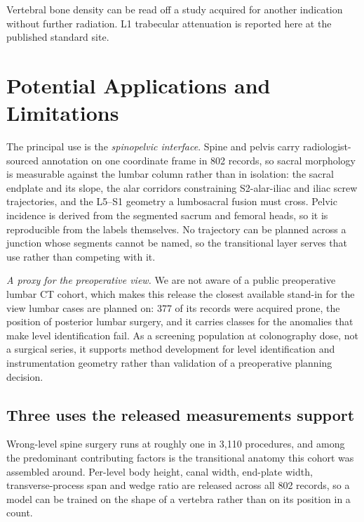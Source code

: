 \documentclass[aapm,mph,amsmath,amssymb,reprint]{revtex4-2}
\begin{document}

Vertebral bone density can be read off a study acquired for another indication without
further radiation.\cite{pickhardt2013} L1 trabecular attenuation is reported here at the
published standard site.

\section{Potential Applications and Limitations}\label{sec:applications}

The principal use is the \emph{spinopelvic interface}. Spine and pelvis carry
radiologist-sourced annotation on one coordinate frame in 802 records, so sacral morphology is
measurable against the lumbar column rather than in isolation: the sacral endplate and its
slope, the alar corridors constraining S2-alar-iliac and iliac screw trajectories, and the
L5--S1 geometry a lumbosacral fusion must cross. Pelvic incidence is derived from the segmented
sacrum and femoral heads, so it is reproducible from the labels themselves. No trajectory can
be planned across a junction whose segments cannot be named, so the transitional layer serves
that use rather than competing with it.

\emph{A proxy for the preoperative view.} We are not aware of a public preoperative lumbar CT
cohort, which makes this release the closest available stand-in for the view lumbar cases are
planned on: 377 of its records were acquired prone, the position of posterior lumbar surgery, and it carries classes for the
anomalies that make level identification fail. As a screening population at colonography
dose, not a surgical series, it supports method development for level identification and
instrumentation geometry rather than validation of a preoperative planning decision.

\subsection{Three uses the released measurements support}

Wrong-level spine surgery runs at roughly one in 3{,}110 procedures, and among the predominant
contributing factors is the transitional anatomy this cohort was assembled
around.\cite{mody2008,epstein2021} Per-level body height, canal width, end-plate width,
transverse-process span and wedge ratio are released across all 802 records, so a model can be
trained on the shape of a vertebra rather than on its position in a count.
\end{document}
